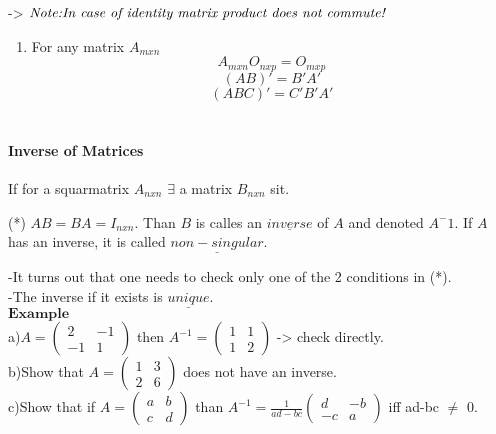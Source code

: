 \documentclass[]{article}
\providecommand{\tightlist}{%
  \setlength{\itemsep}{0pt}\setlength{\parskip}{0pt}}
\let\oldparagraph\paragraph
\renewcommand{\paragraph}[1]{\oldparagraph{#1}\mbox{}}
\begin{document}
-\textgreater{}
\(\text{\textit{Note:In case of identity matrix product does not commute!}}\)\\

\begin{enumerate}
\def\labelenumi{\arabic{enumi}.}
\setcounter{enumi}{4}
\tightlist
\item
  For any matrix \(A_{mxn}\) \[A_{mxn}O_{nxp}=O_{mxp}\] \[(AB)'=B'A'\]
  \[(ABC)'=C'B'A'\]\\
\end{enumerate}

\newpage

\paragraph{\texorpdfstring{Inverse of Matrices\\
}{Inverse of Matrices }}\label{inverse-of-matrices}

\begin{tcolorbox}[colback=green!5,colframe=red!40!black,title=Definition]
  If for a squarmatrix $A_{nxn}$ $\exists$  a matrix $B_{nxn}$ sit.\
  
  (*) $AB = BA = I_{nxn}$.  Than $B$ is calles an $\underline{inverse}$ of $A$ and denoted $A^-1$. If $A$ has an inverse, it is called $\underline{non-singular}$.
  

\end{tcolorbox}

-It turns out that one needs to check only one of the 2 conditions in
(*).\\[2\baselineskip] -The inverse if it exists is
\(\underline{unique}\).\\

\(\mathbf{Example}\)\\
 a)\(A=\begin{pmatrix} 2 & -1 \\ -1 & 1 \end{pmatrix}\) then
\(A^{-1}=\begin{pmatrix} 1 & 1 \\ 1 & 2 \end{pmatrix}\) -\textgreater{}
check directly.\\

b)Show that \(A=\begin{pmatrix} 1 & 3 \\ 2 & 6 \end{pmatrix}\) does not
have an inverse.\\

c)Show that if \(A=\begin{pmatrix} a & b \\ c & d \end{pmatrix}\) than
\(A^{-1} =\frac{1}{ad-bc}\begin{pmatrix} d & -b \\ -c & a \end{pmatrix}\)
iff ad-bc \(\neq\) 0.\\
\end{document}
